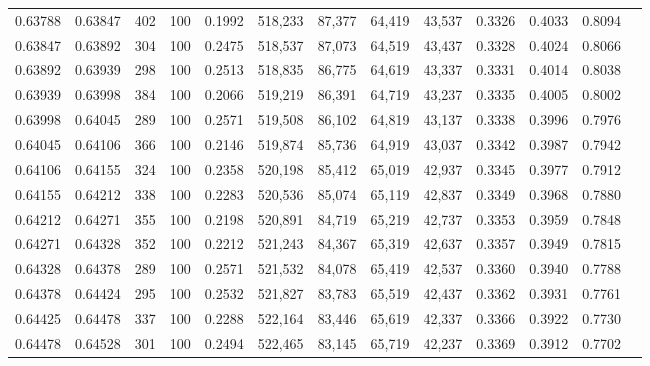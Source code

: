 \begin{tabular}{rrrrrrrrrrrrr}
0.63788 & 0.63847 &   402 & 100 &                                     0.1992 & 518,233 &  87,377 &  64,419 &  43,537 & 0.3326 & 0.4033 & 0.8094 \\
0.63847 & 0.63892 &   304 & 100 &                                     0.2475 & 518,537 &  87,073 &  64,519 &  43,437 & 0.3328 & 0.4024 & 0.8066 \\
0.63892 & 0.63939 &   298 & 100 &                                     0.2513 & 518,835 &  86,775 &  64,619 &  43,337 & 0.3331 & 0.4014 & 0.8038 \\
0.63939 & 0.63998 &   384 & 100 &                                     0.2066 & 519,219 &  86,391 &  64,719 &  43,237 & 0.3335 & 0.4005 & 0.8002 \\
0.63998 & 0.64045 &   289 & 100 &                                     0.2571 & 519,508 &  86,102 &  64,819 &  43,137 & 0.3338 & 0.3996 & 0.7976 \\
0.64045 & 0.64106 &   366 & 100 &                                     0.2146 & 519,874 &  85,736 &  64,919 &  43,037 & 0.3342 & 0.3987 & 0.7942 \\
0.64106 & 0.64155 &   324 & 100 &                                     0.2358 & 520,198 &  85,412 &  65,019 &  42,937 & 0.3345 & 0.3977 & 0.7912 \\
0.64155 & 0.64212 &   338 & 100 &                                     0.2283 & 520,536 &  85,074 &  65,119 &  42,837 & 0.3349 & 0.3968 & 0.7880 \\
0.64212 & 0.64271 &   355 & 100 &                                     0.2198 & 520,891 &  84,719 &  65,219 &  42,737 & 0.3353 & 0.3959 & 0.7848 \\
0.64271 & 0.64328 &   352 & 100 &                                     0.2212 & 521,243 &  84,367 &  65,319 &  42,637 & 0.3357 & 0.3949 & 0.7815 \\
0.64328 & 0.64378 &   289 & 100 &                                     0.2571 & 521,532 &  84,078 &  65,419 &  42,537 & 0.3360 & 0.3940 & 0.7788 \\
0.64378 & 0.64424 &   295 & 100 &                                     0.2532 & 521,827 &  83,783 &  65,519 &  42,437 & 0.3362 & 0.3931 & 0.7761 \\
0.64425 & 0.64478 &   337 & 100 &                                     0.2288 & 522,164 &  83,446 &  65,619 &  42,337 & 0.3366 & 0.3922 & 0.7730 \\
0.64478 & 0.64528 &   301 & 100 &                                     0.2494 & 522,465 &  83,145 &  65,719 &  42,237 & 0.3369 & 0.3912 & 0.7702 \\

\end{tabular}
